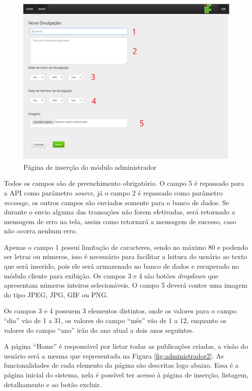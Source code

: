  \begin{figure}
\centering
\includegraphics[width=15cm]{figuras/administrador1}
\caption{Página de inserção do módulo administrador}
\label{fig:administrador1}
\end{figure}

Todos os campos são de preenchimento obrigatório. O campo 5 é repassado para a API como parâmetro \textit{source}, já o campo 2 é repassado como parâmetro \textit{message}, os outros campos são enviados somente para o banco de dados. Se durante o envio alguma das transações não forem efetivadas, será retornado a mensagem de erro na tela, assim como retornará a mensagem de sucesso, caso não ocorra nenhum erro.

Apenas o campo 1 possui limitação de caracteres, sendo no máximo 80 e podendo ser letras ou números, isso é necessário para facilitar a leitura do usuário ao texto que será inserido, pois ele será armazenado no banco de dados e recuperado no módulo cliente para exibição. Os campos 3 e 4 são botões \textit{dropdown} que apresentam números inteiros selecionáveis. O campo 5 deverá conter uma imagem do tipo JPEG, JPG, GIF ou PNG.

Os campos 3 e 4 possuem 3 elementos distintos, onde os valores para o campo ``dia'' vão de 1 a 31, os valores do campo ``mês'' vão de 1 a 12, enquanto os valores do campo ``ano'' irão do ano atual a dois anos seguintes.

A página ``Home'' é responsável por listar todas as publicações criadas, a visão do usuário será a mesma que representada na Figura \ref{fig:administrador2}. As funcionalidades de cada elemento da página são descritas logo abaixo. Essa é a página inicial do sistema, nela é possível ter acesso à página de inserção, listagem, detalhamento e ao botão excluir.

